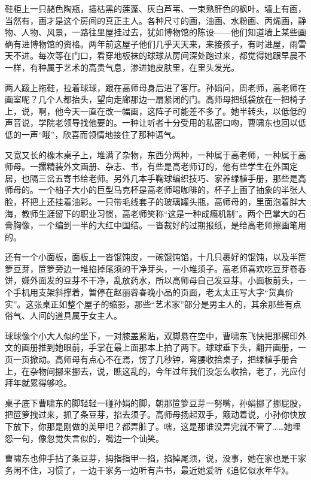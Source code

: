\documentclass[lang=cn,newtx,12pt,scheme=chinese]{elegantbook}
\begin{document}
鞋柜上一只赭色陶瓶，插枯黑的莲蓬、灰白芦苇、一束熟肝色的枫叶。墙上有画，当然有，画才是这个房间的真正主人。各种尺寸的画，油画、水粉画、丙烯画，静物、人物、风景，一路往里屋挂过去，犹如博物馆的陈设——他们知道墙上某些画确有进博物馆的资格。两年前这屋子他们几乎天天来，来接孩子，有时进屋，雨雪天不进。每次等在门口，看穿地板袜的球球从房间深处跑过来，都觉得她跟早晨不一样，有种属于艺术的高贵气息，渗进她皮肤里，在里头发光。

两人趿上拖鞋，拉着球球，跟在高师母身后进了客厅。孙娟问，周老师，高老师在画室呢？几个人都抬头，望向走廊那边一扇紧闭的门。高师母把纸袋放在一把椅子上，说，啊，他今天一直在改一幅画，这阵子可能差不多了。她半转头，以低低的声音说，学院老领导找他要的。一种让听者十分受用的私密口吻，曹啸东也回以低低的一声“哦”，欣喜而领情地接住了那种语气。

又宽又长的橡木桌子上，堆满了杂物，东西分两种，一种属于高老师，一种属于高师母。一摞精装外文画册、杂志、书，有些是高老师订的，他有些学生在外国定居，也隔三岔五寄书给老师。另外几本手鞠球编织技巧、家养绿植手册，那些是高师母的。一个柚子大小的巨型马克杯是高老师喝咖啡的，杯子上画了抽象的半张人脸，杯把上还挂着油彩。一只带毛线套子的玻璃罐头瓶，高师母的，里面泡着胖大海，教师生涯留下的职业习惯，高老师笑称“这是一种成瘾机制”。两个巴掌大的石膏胸像，一个编到一半的大红中国结。一沓裁好的过期报纸，是给高老师擦画笔用的。

还有一个小面板，面板上一沓馄饨皮，一碗馄饨馅，十几只裹好的馄饨，以及半笸箩豆芽，笸箩旁边一堆掐掉尾须的干净芽头，一小堆须子。高老师喜欢吃豆芽卷春饼，嫌外面发的豆芽不干净，乱放药水，所以高师母自己发豆芽。小面板前头，一个手机用支架斜撑着，暂停在赵丽蓉春晚小品的页面，老太太正写大字“货真价实”。这张桌正如整个屋子的缩影，那些“艺术家”部分是男主人的，其余那些有点俗气、人间的道具属于女主人。

球球像个小大人似的坐下，一对膝盖紧贴，双脚悬在空中，曹啸东飞快把那摞印外文的画册推到她眼前，手掌在最上面那本上拍了两下。球球垂下头，翻开画册，一页一页掀动。高师母有点心不在焉，愣了几秒钟，弯腰收拾桌子，把绿植手册合上，在杂物间挪来挪去，说，瞧这乱的，今年过年我们没怎么收拾，老了，光应付拜年就累得够呛。

桌子底下曹啸东的脚轻轻一碰孙娟的脚，朝那笸箩豆芽一努嘴，孙娟挪了挪屁股，把笸箩拽过来，抓了条豆芽，掐去须子。高师母扬起双手，簸动着说，小孙你快放下放下，你那是刚做的美甲吧？都弄脏了。嗐，这是那谁没弄完就不管了……她埋怨一句，像忽觉失言似的，嘴边一个讪笑。

曹啸东也伸手拈了条豆芽，拇指指甲一掐，掐掉尾须，说，没事，她在家也是干家务闲不住，习惯了，一边干家务一边听有声书，最近她爱听《追忆似水年华》。
\end{document}
